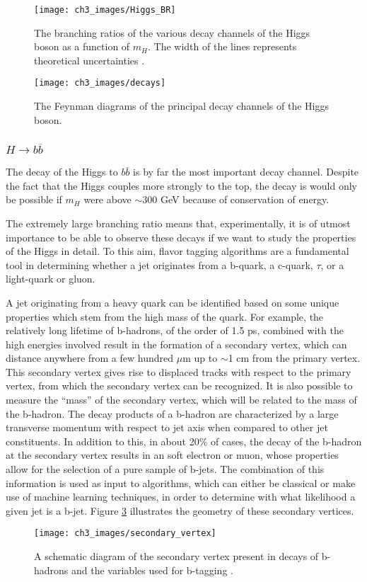 \documentclass[10pt,a4paper]{book}
\begin{document}
\begin{figure}
\centering
\texttt{[image: ch3\_images/Higgs\_BR]}
\caption{The branching ratios of the various decay channels of the Higgs boson as a function of $m_H$. The width of the lines represents theoretical uncertainties \cite{LHCHiggsCrossSectionWorkingGroup:2013rie}.}
\label{Higgs branching ratios}
\end{figure}

\begin{figure}
\centering
\texttt{[image: ch3\_images/decays]}
\caption{The Feynman diagrams of the principal decay channels of the Higgs boson.}
\label{decays}
\end{figure}

\subsubsection{$H\rightarrow b\overline{b}$}

The decay of the Higgs to $b\overline{b}$ is by far the most important decay channel. Despite the fact that the Higgs couples more strongly to the top, the decay is would only be possible if $m_H$ were above $\sim 300$ GeV because of conservation of energy. 

The extremely large branching ratio means that, experimentally, it is of utmost importance to be able to observe these decays if we want to study the properties of the Higgs in detail. To this aim, flavor tagging algorithms are a fundamental tool in determining whether a jet originates from a b-quark, a c-quark, $\tau$, or a light-quark or gluon. 

A jet originating from a heavy quark can be identified based on some unique properties which stem from the high mass of the quark. For example, the relatively long lifetime of b-hadrons, of the order of 1.5 ps, combined with the high energies involved result in the formation of a secondary vertex, which can distance anywhere from a few hundred $\mu$m up to $\sim$1 cm from the primary vertex. This secondary vertex gives rise to displaced tracks with respect to the primary vertex, from which the secondary vertex can be recognized. It is also possible to measure the ``mass'' of the secondary vertex, which will be related to the mass of the b-hadron. The decay products of a b-hadron are characterized by a large transverse momentum with respect to jet axis when compared to other jet constituents. In addition to this, in about 20\% of cases, the decay of the b-hadron at the secondary vertex results in an soft electron or muon, whose properties allow for the selection of a pure sample of b-jets. The combination of this information is used as input to algorithms, which can either be classical or make use of machine learning techniques, in order to determine with what likelihood a given jet is a b-jet. Figure \ref{secondary vertex} illustrates the geometry of these secondary vertices.
\begin{figure}
\centering
\texttt{[image: ch3\_images/secondary\_vertex]}
\caption{A schematic diagram of the secondary vertex present in decays of b-hadrons and the variables used for b-tagging \cite{CMS:2017wtu}.}
\label{secondary vertex}
\end{figure}
\end{document}
